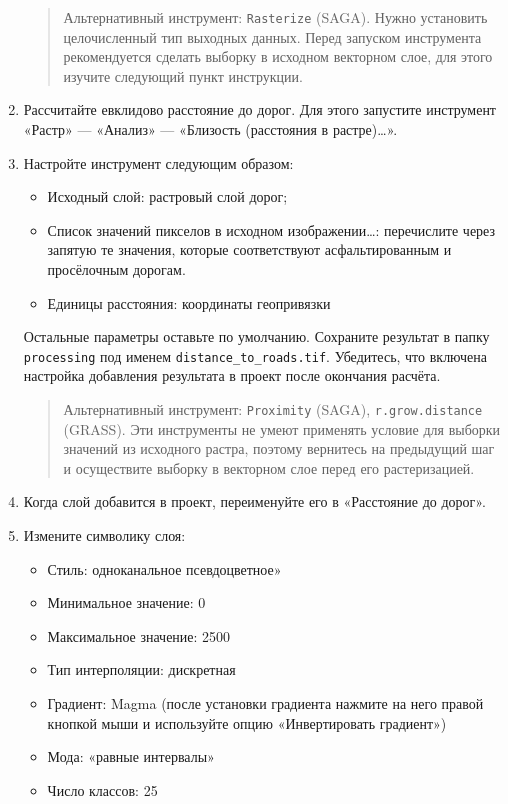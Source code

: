 \documentclass[
  12pt,
]{book}
\providecommand{\tightlist}{%
  \setlength{\itemsep}{0pt}\setlength{\parskip}{0pt}}
\begin{document}
\begin{enumerate}
  \begin{quote}
  Альтернативный инструмент: \texttt{Rasterize} (SAGA). Нужно установить целочисленный тип выходных данных. Перед запуском инструмента рекомендуется сделать выборку в исходном векторном слое, для этого изучите следующий пункт инструкции.
  \end{quote}
\item
  Рассчитайте евклидово расстояние до дорог. Для этого запустите инструмент «Растр» --- «Анализ» --- «Близость (расстояния в растре)\ldots».
\item
  Настройте инструмент следующим образом:

  \begin{itemize}
  \item
    Исходный слой: растровый слой дорог;
  \item
    Список значений пикселов в исходном изображении\ldots: перечислите через запятую те значения, которые соответствуют асфальтированным и просёлочным дорогам.
  \item
    Единицы расстояния: координаты геопривязки
  \end{itemize}

  Остальные параметры оставьте по умолчанию. Сохраните результат в папку \texttt{processing} под именем \texttt{distance\_to\_roads.tif}. Убедитесь, что включена настройка добавления результата в проект после окончания расчёта.

  \begin{quote}
  Альтернативный инструмент: \texttt{Proximity} (SAGA), \texttt{r.grow.distance} (GRASS). Эти инструменты не умеют применять условие для выборки значений из исходного растра, поэтому вернитесь на предыдущий шаг и осуществите выборку в векторном слое перед его растеризацией.
  \end{quote}
\item
  Когда слой добавится в проект, переименуйте его в «Расстояние до дорог».
\item
  Измените символику слоя:

  \begin{itemize}
  \tightlist
  \item
    Стиль: одноканальное псевдоцветное»
  \item
    Минимальное значение: 0
  \item
    Максимальное значение: 2500
  \item
    Тип интерполяции: дискретная
  \item
    Градиент: Magma (после установки градиента нажмите на него правой кнопкой мыши и используйте опцию «Инвертировать градиент»)
  \item
    Мода: «равные интервалы»
  \item
    Число классов: 25
  \end{itemize}


\end{enumerate}
\end{document}
